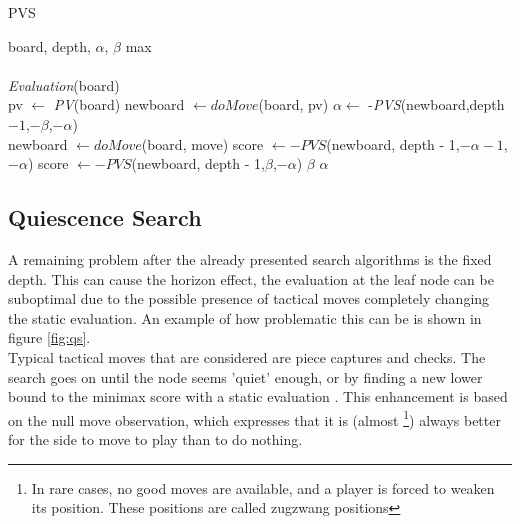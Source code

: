 \begin{algorithm}
\caption{PVS}
\label{al:pvs}
\begin{algorithmic}[]
\REQUIRE board, depth, $\alpha$, $\beta$
\ENSURE max \\
 \\
\RETURN \textit{Evaluation}(board) 
\ENDIF \\
\STATE pv $\leftarrow$ \textit{PV}(board)
\STATE newboard $\leftarrow doMove$(board, pv)
\STATE $\alpha \leftarrow$ -\textit{PVS}(newboard,depth$-1$,$-\beta$,$-\alpha$) \\
\STATE newboard $\leftarrow doMove$(board, move)
\STATE score $\leftarrow -PVS$(newboard, depth - 1,$-\alpha-1$,$-\alpha$)
\STATE score $\leftarrow -PVS$(newboard, depth - 1,$\beta$,$-\alpha$)
\ENDIF
{}
\RETURN $\beta$
\ENDIF
{}
\ENDIF
\ENDFOR
\RETURN $\alpha$
\end{algorithmic}
\end{algorithm}

\subsection{Quiescence Search}
\label{subsec:qs}
A remaining problem after the already presented search algorithms is the fixed depth. This can cause the horizon effect, the evaluation at the leaf node can be suboptimal due to the possible presence of tactical moves completely changing the static evaluation. An example of how problematic this can be is shown in figure \ref{fig:qs}. \\
Typical tactical moves that are considered are piece captures and checks. The search goes on until the node seems 'quiet' enough, or by finding a new lower bound to the minimax score with a static evaluation \cite{beal90}. This enhancement is based on the null move observation, which expresses that it is (almost \footnote{In rare cases, no good moves are available, and a player is forced to weaken its position. These positions are called zugzwang positions}) always better for the side to move to play than to do nothing.

